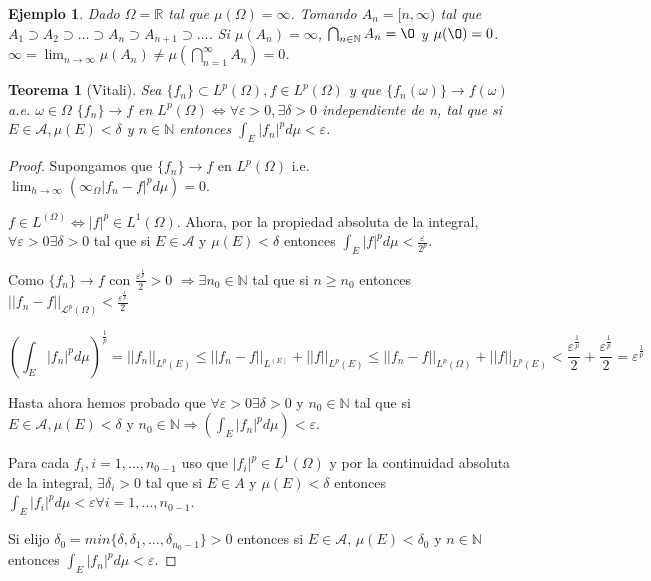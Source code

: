 \documentclass[11pt, a4paper]{article}
\newcommand{\R}{\mathbb{R}}
\newcommand{\N}{\mathbb{N}}
\theoremstyle{theorem-style}
\newtheorem{nth}{Teorema}[section]
\theoremstyle{definition-style}
\theoremstyle{remark-style}
\theoremstyle{example-style}
\newtheorem{ejemplo}{Ejemplo}[section]
\begin{document}

\begin{ejemplo}
  Dado $\Omega = \R$ tal que $\mu(\Omega) = \infty$. Tomando $A_n = [n,
  \infty)$ tal que $A_1 \supset A_2 \supset \hdots \supset A_n \supset
  A_{n+1} \supset \hdots$. Si $\mu(A_n) = \infty$, $\bigcap_{n\in \N} A_n =
  \O$ y $\mu(\O) = 0$. $\infty = \lim_{n \to \infty} \mu(A_n) \neq
  \mu(\bigcap_{n=1}^{\infty} A_n) = 0$.
\end{ejemplo}

\begin{nth}[Vitali]
  Sea $\{f_n\} \subset L^p(\Omega), f \in L^p(\Omega)$ y que
  $\{f_n(\omega)\} \rightarrow f(\omega)$ a.e. $\omega \in \Omega$ $\{f_n\}
  \rightarrow f$ en $L^p(\Omega) \Leftrightarrow \forall \varepsilon > 0,
  \exists \delta > 0$ independiente de n, tal que si $E \in \mathcal A, \mu(E) <
  \delta$ y $n \in \N$ entonces $\int_E |f_n|^pd\mu < \varepsilon$.
\end{nth}

\begin{proof}
   \boxed{\Rightarrow} Supongamos que $\{f_n\} \rightarrow f$ en $L^p(\Omega)$
   i.e. $\lim_{h \to \infty}(\infty_{\Omega}|f_n - f|^pd\mu) = 0$.

   $f \in L^(\Omega) \Leftrightarrow |f|^p \in L^1(\Omega)$. Ahora, por la
   propiedad absoluta de la integral, $\forall \varepsilon > 0 \exists \delta >
   0$ tal que si $E \in \mathcal A$ y $\mu(E) < \delta$ entonces $\displaystyle \int_E |f|^p d\mu < \frac{\varepsilon}{2^p}$.

   Como $\{f_n\} \rightarrow f$ con  $\frac{\varepsilon^{\frac{1}{p}}}{2} > 0$ $\Rightarrow \exists n_0 \in \N$ tal que si $n
   \geq n_0$ entonces $||f_n - f||_{\mathcal L^p(\Omega)} < \frac{\varepsilon^{\frac{1}{p}}}{2}$ 

   $$\left(\int_E |f_n|^p d\mu\right)^{\frac{1}{p}} = ||f_n||_{ L^p(E)} \leq ||f_n -
   f||_{ L^(E)}+ ||f||_{ L^p(E)} \leq ||f_n - f||_{
     L^p(\Omega)} + ||f||_{ L^p(E)} <
   \frac{\varepsilon^{\frac{1}{p}}}{2} + \frac{\varepsilon^{\frac{1}{p}}}{2} =
   \varepsilon^{\frac{1}{p}}$$

   Hasta ahora hemos probado que $\forall \varepsilon > 0 \exists \delta > 0$ y
   $n_0 \in \N$ tal que si $E \in \mathcal A, \mu(E) <
  \delta$ y $n_0 \in \N \Rightarrow \left( \int_E|f_n|^p d\mu \right) <
  \varepsilon$.

  Para cada $f_i, i=1, \hdots, n_{0-1}$ uso que $|f_i|^p \in L^1(\Omega)$ y por
  la continuidad absoluta de la integral, $\exists \delta_i > 0$ tal que si $E
  \in A$ y $\mu(E) < \delta$ entonces $\int_E |f_i|^p d\mu < \varepsilon \forall
  i = 1, \hdots , n_{0-1}$.

  Si elijo $\delta_0 = min\{\delta, \delta_1, \hdots, \delta_{n_0 -1}\} > 0$
  entonces si $E \in \mathcal A$, $\mu(E) < \delta_0$ y $n \in \N$ entonces
  $\int_E |f_n|^p d \mu < \varepsilon$.

  \boxed{\Leftarrow}

  
\end{proof}
\end{document}
